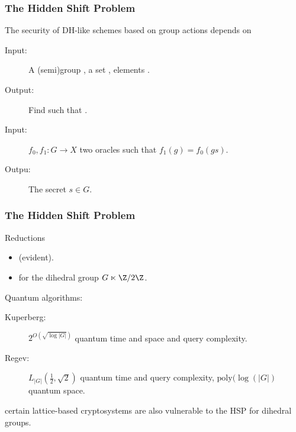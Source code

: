 \documentclass{beamer}
\renewcommand{\emph}[1]{}
\begin{document}

\begin{frame}
  \frametitle{The Hidden Shift Problem}
  
  The security of DH-like schemes based on group actions depends on

  \begin{definition}
    \begin{description}
    \item[Input:] A (semi)group \emph{$G$}, a set \emph{$X$}, elements
      \emph{$x,y\in X$}.
    \item[Output:] Find \emph{$s\in G$} such that \emph{$y=s\cdot x$}.
    \end{description}
  \end{definition}

  \begin{definition}
    \begin{description}
    \item[Input:] \alert{$f_0,f_1:G\to X$} two oracles such that
      \alert{$f_1(g) = f_0(gs)$}.
    \item[Outpu:] The secret \alert{$s\in G$}.
    \end{description}
  \end{definition}
\end{frame}


\begin{frame}
  \frametitle{The Hidden Shift Problem}
  
  \begin{block}{Reductions}
    \begin{itemize}
    \item \emph{SAP $\to$ HShP} (evident).
    \item \emph{HShP $\to$ non-abelian HSP} for the dihedral group
      $G\ltimes\Z/2\Z$.
    \end{itemize}
  \end{block}

  \begin{block}{Quantum algorithms:}
    \begin{description}
    \item[Kuperberg:] \alert{$2^{O(\sqrt{\log|G|})}$} quantum time and space
      and query complexity.
    \item[Regev:] \alert{$L_{|G|}(\frac{1}{2},\sqrt{2})$} quantum
      time and query complexity, \alert{$\text{poly}(\log(|G|)$} quantum
      space.
    \end{description}
  \end{block}

  \emph{Remark (Regev):} certain lattice-based cryptosystems are also
  vulnerable to the HSP for dihedral groups.
\end{frame}
\end{document}
